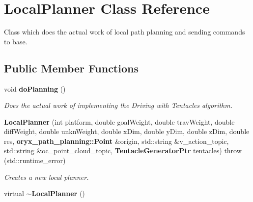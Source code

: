 \section{\-Local\-Planner \-Class \-Reference}
\label{classLocalPlanner}


\-Class which does the actual work of local path planning and sending commands to base.  


\subsection*{\-Public \-Member \-Functions}
\begin{DoxyCompactItemize}
\item 
void {\bf do\-Planning} ()
\begin{DoxyCompactList}\small\item\em \-Does the actual work of implementing the \-Driving with \-Tentacles algorithm. \end{DoxyCompactList}\item 
{\bf \-Local\-Planner} (int platform, double goal\-Weight, double trav\-Weight, double diff\-Weight, double unkn\-Weight, double x\-Dim, double y\-Dim, double z\-Dim, double res, {\bf oryx\-\_\-path\-\_\-planning\-::\-Point} \&origin, std\-::string \&v\-\_\-action\-\_\-topic, std\-::string \&oc\-\_\-point\-\_\-cloud\-\_\-topic, {\bf \-Tentacle\-Generator\-Ptr} tentacles)  throw (std\-::runtime\-\_\-error)
\begin{DoxyCompactList}\small\item\em \-Creates a new local planner. \end{DoxyCompactList}\item 
virtual {\bf $\sim$\-Local\-Planner} ()
\end{DoxyCompactItemize}
